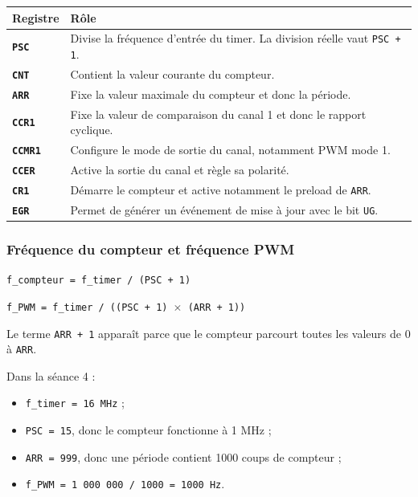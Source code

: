 \documentclass[11pt,a4paper]{article}
\begin{document}
	\begin{center}
		\begin{tabular}{>{\bfseries}p{3.5cm}p{9.5cm}}
			\toprule
			Registre & Rôle \\
			\midrule
			\texttt{PSC} & Divise la fréquence d'entrée du timer. La division réelle vaut \texttt{PSC + 1}. \\
			\texttt{CNT} & Contient la valeur courante du compteur. \\
			\texttt{ARR} & Fixe la valeur maximale du compteur et donc la période. \\
			\texttt{CCR1} & Fixe la valeur de comparaison du canal 1 et donc le rapport cyclique. \\
			\texttt{CCMR1} & Configure le mode de sortie du canal, notamment PWM mode 1. \\
			\texttt{CCER} & Active la sortie du canal et règle sa polarité. \\
			\texttt{CR1} & Démarre le compteur et active notamment le preload de \texttt{ARR}. \\
			\texttt{EGR} & Permet de générer un événement de mise à jour avec le bit \texttt{UG}. \\
			\bottomrule
		\end{tabular}
	\end{center}
	
	\subsubsection*{Fréquence du compteur et fréquence PWM}
	
	\begin{center}
		\texttt{f\_compteur = f\_timer / (PSC + 1)}
	\end{center}
	
	\begin{center}
		\texttt{f\_PWM = f\_timer / ((PSC + 1) $\times$ (ARR + 1))}
	\end{center}
	
	Le terme \texttt{ARR + 1} apparaît parce que le compteur parcourt toutes les valeurs de 0 à \texttt{ARR}.
	
	Dans la séance 4 :
	
	\begin{itemize}
		\item \texttt{f\_timer = 16 MHz} ;
		\item \texttt{PSC = 15}, donc le compteur fonctionne à 1 MHz ;
		\item \texttt{ARR = 999}, donc une période contient 1000 coups de compteur ;
		\item \texttt{f\_PWM = 1 000 000 / 1000 = 1000 Hz}.
	\end{itemize}
	
\end{document}
